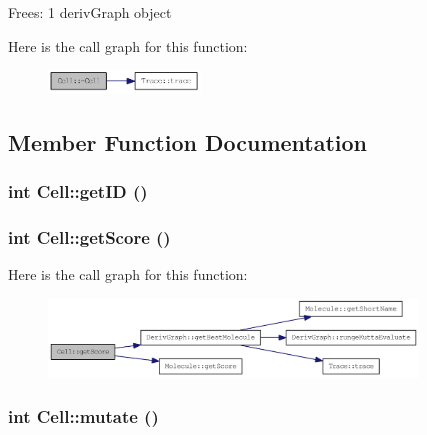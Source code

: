 Frees: 1 derivGraph object 

Here is the call graph for this function:\nopagebreak
\begin{figure}[H]
\begin{center}
\leavevmode
\includegraphics[width=115pt]{classCell_a9fa559f7a28e2b4336c6879ca09304d8_cgraph}
\end{center}
\end{figure}


\subsection{Member Function Documentation}
\hypertarget{classCell_a6fb5e28360b3a6e53400af8b950f6203}{
\subsubsection[{getID}]{\setlength{\rightskip}{0pt plus 5cm}int Cell::getID ()}}
\label{classCell_a6fb5e28360b3a6e53400af8b950f6203}
\hypertarget{classCell_a3fbb8b244cc5c516d0728a987d07bf0f}{
\subsubsection[{getScore}]{\setlength{\rightskip}{0pt plus 5cm}int Cell::getScore ()}}
\label{classCell_a3fbb8b244cc5c516d0728a987d07bf0f}


Here is the call graph for this function:\nopagebreak
\begin{figure}[H]
\begin{center}
\leavevmode
\includegraphics[width=278pt]{classCell_a3fbb8b244cc5c516d0728a987d07bf0f_cgraph}
\end{center}
\end{figure}
\hypertarget{classCell_a555fa98c5f1dc8d7c88c7a24f69994ff}{
\subsubsection[{mutate}]{\setlength{\rightskip}{0pt plus 5cm}int Cell::mutate ()}}
\label{classCell_a555fa98c5f1dc8d7c88c7a24f69994ff}


